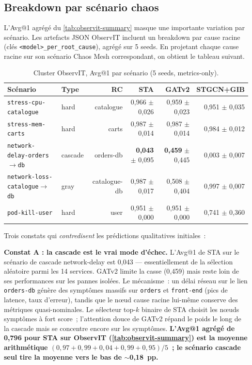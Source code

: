 \documentclass[a4paper,11pt,oneside]{report}
\begin{document}
\subsection{Breakdown par sc\'enario chaos}
\label{sec:resultats-per-scenario}

L'Avg@1 agr\'eg\'e du \cref{tab:observit-summary} masque une importante variation par sc\'enario. Les artefacts JSON ObservIT incluent un breakdown par cause racine (cl\'es \texttt{<model>\_per\_root\_cause}), agr\'eg\'e sur 5 seeds. En projetant chaque cause racine sur son sc\'enario Chaos Mesh correspondant, on obtient le tableau suivant.

\begin{table}[ht]
\centering
\caption{Cluster ObservIT, Avg@1 par sc\'enario (5 seeds, metrics-only).}
\label{tab:observit-per-scenario}
\begin{tabular}{llrrrr}
\toprule
Sc\'enario & Type & RC & STA & GATv2 & STGCN+GIB \\
\midrule
\texttt{stress-cpu-catalogue} & hard & catalogue & 0{,}966 $\pm$ 0{,}026 & 0{,}959 $\pm$ 0{,}023 & 0{,}951 $\pm$ 0{,}035 \\
\texttt{stress-mem-carts} & hard & carts & 0{,}987 $\pm$ 0{,}014 & 0{,}987 $\pm$ 0{,}014 & 0{,}984 $\pm$ 0{,}012 \\
\texttt{network-delay-orders$\to$db} & cascade & orders-db & \textbf{0{,}043} $\pm$ 0{,}095 & \textbf{0{,}459} $\pm$ 0{,}445 & 0{,}003 $\pm$ 0{,}007 \\
\texttt{network-loss-catalogue$\to$db} & gray & catalogue-db & 0{,}987 $\pm$ 0{,}017 & 0{,}508 $\pm$ 0{,}404 & 0{,}997 $\pm$ 0{,}007 \\
\texttt{pod-kill-user} & hard & user & 0{,}951 $\pm$ 0{,}000 & 0{,}951 $\pm$ 0{,}000 & 0{,}741 $\pm$ 0{,}360 \\
\bottomrule
\end{tabular}
\end{table}

Trois constats qui \emph{contredisent} les pr\'edictions qualitatives initiales~:

\textbf{Constat A : la cascade est le vrai mode d'\'echec.} L'Avg@1 de STA sur le sc\'enario de cascade network-delay est 0{,}043 --- essentiellement de la s\'election al\'eatoire parmi les 14 services. GATv2 limite la casse (0{,}459) mais reste loin de ses performances sur les pannes isol\'ees. Le m\'ecanisme~: un d\'elai r\'eseau sur le lien \texttt{orders-db} g\'en\`ere des sympt\^omes massifs sur \texttt{orders} et \texttt{front-end} (pics de latence, taux d'erreur), tandis que le nœud cause racine lui-m\^eme conserve des m\'etriques quasi-nominales. Le s\'electeur top-$k$ binaire de STA choisit les nœuds sympt\^omes \`a fort score~; l'attention douce de GATv2 r\'epand le poids le long de la cascade mais se concentre encore sur les sympt\^omes. \textbf{L'Avg@1 agr\'eg\'e de 0{,}796 pour STA sur ObservIT (\cref{tab:observit-summary}) est la moyenne arithm\'etique $(0{,}97+0{,}99+0{,}04+0{,}99+0{,}95)/5$~; le sc\'enario cascade seul tire la moyenne vers le bas de $\sim$0{,}18~pp.}
\end{document}
